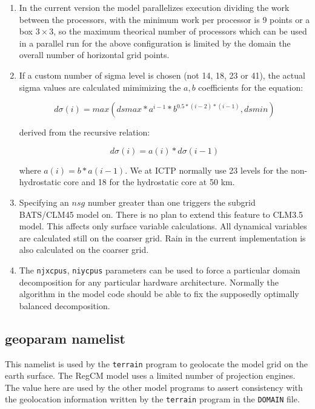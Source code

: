 \begin{enumerate}
\item In the current version the model parallelizes execution dividing
the work between the processors, with the minimum work per processor is 9
points or a box $3\times3$, so the maximum theorical number of processors which
can be used in a parallel run for the above configuration is limited by
the domain the overall number of horizontal grid points.
\item If a custom number of sigma level is chosen (not 14, 18, 23 or 41), the
actual sigma values are calculated mimimizing the $a,b$ coefficients for the 
equation:

\begin{equation}
  d\sigma(i) = max(dsmax*a^{i-1}*b^{0.5*(i-2)*(i-1)},dsmin)
\end{equation}

derived from the recursive relation:

\begin{equation}
  d\sigma(i) = a(i)*d\sigma(i-1)
\end{equation}

where $a(i) = b*a(i-1)$. We at ICTP normally use 23 levels for the
non-hydrostatic core and 18 for the hydrostatic core at 50 km.
\item Specifying an $nsg$ number greater than one triggers the subgrid
BATS/CLM45 model on. There is no plan to extend this feature to CLM3.5 model.
This affects only surface variable calculations. All dynamical
variables are calculated still on the coarser grid.
Rain in the current implementation is also calculated on the coarser
grid.
\item The \verb=njxcpus=, \verb=niycpus= parameters can be used to force
a particular domain decomposition for any particular hardware architecture.
Normally the algorithm in the model code should be able to fix the
supposedly optimally balanced decomposition.
\end{enumerate}

\subsection{geoparam namelist}
\label{geoparam}

This namelist is used by the \verb=terrain= program to geolocate the model grid
on the earth surface. The RegCM model uses a limited number of projection
engines. The value here are used by the other model programs to assert
consistency with the geolocation information written by the \verb=terrain=
program in the \verb=DOMAIN= file.

